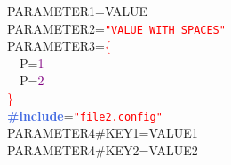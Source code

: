 \noindent
\mbox{}PARAMETER1\textcolor{BrickRed}{=}VALUE \\
\mbox{}PARAMETER2\textcolor{BrickRed}{=}\texttt{\textcolor{Red}{"{}VALUE\ WITH\ SPACES"{}}} \\
\mbox{}PARAMETER3\textcolor{BrickRed}{=}\textcolor{Red}{\{} \\
\mbox{}\ \ P\textcolor{BrickRed}{=}\textcolor{Purple}{1} \\
\mbox{}\ \ P\textcolor{BrickRed}{=}\textcolor{Purple}{2} \\
\mbox{}\textcolor{Red}{\}} \\
\mbox{}\textbf{\textcolor{RoyalBlue}{\#include}}=\texttt{\textcolor{Red}{"{}file2.config"{}}} \\
\mbox{}PARAMETER4\#KEY1\textcolor{BrickRed}{=}VALUE1 \\
\mbox{}PARAMETER4\#KEY2\textcolor{BrickRed}{=}VALUE2
